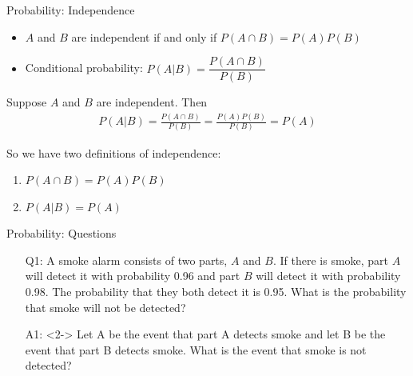 \documentclass[10pt, handout, xcolor=table]{beamer}
\begin{document}
\begin{frame}{Probability: Independence}
\pause
\begin{itemize}
  \setlength{\itemsep}{15pt}
\item $A$ and $B$ are independent if and only if $P(A \cap B) = P(A)P(B)$
\item Conditional probability: $P(A|B) = \dfrac{P(A \cap B)}{P(B)}$
\end{itemize}

Suppose $A$ and $B$ are independent. Then
\begin{align*}
P(A|B) = \frac{P(A \cap B)}{P(B)} = \frac{P(A) P(B)}{P(B)} = P(A)
\end{align*}

So we have two definitions of independence:
\begin{enumerate}
\item $P(A \cap B) = P(A)P(B)$
\item $P(A|B) = P(A)$
\end{enumerate}
\end{frame}

\begin{frame}{Probability: Questions}
\begin{itemize}
  \setlength{\itemsep}{15pt}
\item[Q1:] A smoke alarm consists of two parts, $A$ and $B$. If there is smoke, part $A$ will detect it with probability 0.96 and part $B$ will detect it with probability 0.98. The probability that they both detect it is 0.95. What is the probability that smoke will not be detected?
\item[A1:]<2-> \color{red}
Let A be the event that part A detects smoke and let B be the event that part B detects smoke. What is the event that smoke is not detected?\\
\medskip
{}
\end{itemize}
\end{frame}
\end{document}
